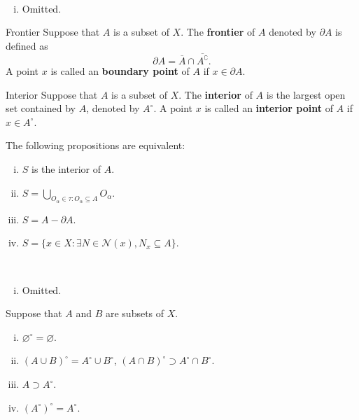 \documentclass{report}
\begin{document}
\begin{prf}~\\ \vspace{-1em}
	\begin{enumerate}[(i)] 
		\item Omitted.
	\end{enumerate}
\end{prf}


\begin{definition}{Frontier}{}
	Suppose that $A$ is a subset of $X$. The \textbf{frontier} of $A$ denoted by $\partial A$ is defined as
	\[
		\partial A=\overline{A}\cap\overline{A^{\complement}}.
	\] A point $x$ is called an \textbf{boundary point} of $A$ if $x\in \partial A$.
\end{definition}


\begin{definition}{Interior}{}
	Suppose that $A$ is a subset of $X$. The \textbf{interior} of $A$ is the largest open set contained by $A$, denoted by $A^{\circ}$. A point $x$ is called an \textbf{interior point} of $A$ if $x\in A^{\circ}$.
\end{definition}


\begin{proposition}{}{}
	The following propositions are equivalent:
	\begin{enumerate}[(i)] 
		\item $S$ is the interior of $A$.
		\item $S=\bigcup\limits_{O_\alpha\in\tau:O_\alpha\subseteq A}O_\alpha$.
		\item $S=A-\partial A$.
		\item $S=\{x\in X:\exists N\in\mathcal{N}(x),N_x\subseteq A\}$.
	\end{enumerate}
\end{proposition}

\begin{prf}~\\ \vspace{-1em}
	\begin{enumerate}[(i)] 
		\item Omitted.
	\end{enumerate}
\end{prf}

\begin{proposition}{}{}
	Suppose that $A$ and $B$ are subsets of $X$.
	\begin{enumerate}[(i)] 
		\item $\varnothing^{\circ}=\varnothing$.
		\item $(A \cup B)^{\circ}=A^{\circ}\cup B^{\circ}$,  $(A \cap B)^{\circ}\supset A^{\circ}\cap B^{\circ}$.
		\item $A\supset A^{\circ}$.
		\item $\left(A^{\circ}\right)^{\circ}=A^{\circ}$.
	\end{enumerate}
\end{proposition}
\end{document}
